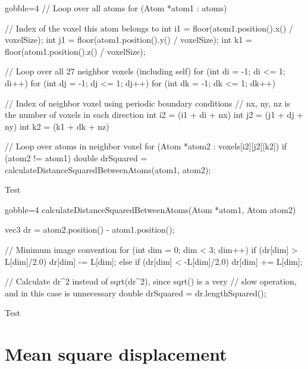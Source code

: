\begin{listing}[H]
\begin{cppcode*}{gobble=4}
    // Loop over all atoms
    for (Atom *atom1 : atoms)
    {
        // Index of the voxel this atom belongs to
        int i1 = floor(atom1.position().x() / voxelSize);
        int j1 = floor(atom1.position().y() / voxelSize);
        int k1 = floor(atom1.position().z() / voxelSize);
        
        // Loop over all 27 neighbor voxels (including self)
        for (int di = -1; di <= 1; di++)
        for (int dj = -1; dj <= 1; dj++)
        for (int dk = -1; dk <= 1; dk++)
        {{{
            // Index of neighbor voxel using periodic boundary conditions
            // nx, ny, nz is the number of voxels in each direction
            int i2 = (i1 + di + nx) %
            int j2 = (j1 + dj + ny) %
            int k2 = (k1 + dk + nz) %
            
            // Loop over atoms in neighbor voxel
            for (Atom *atom2 : voxels[i2][j2][k2])
            {
                if (atom2 != atom1)
                {
                    double drSquared = 
                        calculateDistanceSquaredBetweenAtoms(atom1, atom2);
                }
            }
        }}}
    }
    
\end{cppcode*}
\caption{Test
    \label{list:neighbors}
}
\end{listing}

\begin{listing}[H]
\begin{cppcode*}{gobble=4}
    calculateDistanceSquaredBetweenAtoms(Atom *atom1, Atom atom2)
    {
        vec3 dr = atom2.position() - atom1.position();
        
        // Minimum image convention
        for (int dim = 0; dim < 3; dim++)
        {
            if      (dr[dim] >  L[dim]/2.0) dr[dim] -= L[dim];
            else if (dr[dim] < -L[dim]/2.0) dr[dim] += L[dim];
        }
        
        // Calculate dr^2 instead of sqrt(dr^2), since sqrt() is a very 
        // slow operation, and in this case is unnecessary
        double drSquared = dr.lengthSquared();
    }
\end{cppcode*}
\caption{Test
    \label{list:dr2}
}
\end{listing}

\section{Mean square displacement}
    
